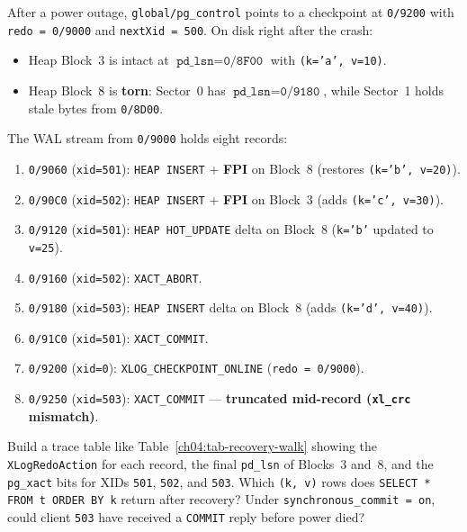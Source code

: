 \begin{exercise}
\label{ch04:ex-trace-recovery}
After a power outage, \texttt{global/pg\_control} points to a checkpoint at \texttt{0/9200} with \texttt{redo = 0/9000} and \texttt{nextXid = 500}. On disk right after the crash:
\begin{itemize}
  \item Heap Block~3 is intact at $\texttt{pd\_lsn} = \texttt{0/8F00}$ with \texttt{(k='a', v=10)}.
  \item Heap Block~8 is \textbf{torn}: Sector~0 has $\texttt{pd\_lsn} = \texttt{0/9180}$, while Sector~1 holds stale bytes from \texttt{0/8D00}.
\end{itemize}
The WAL stream from \texttt{0/9000} holds eight records:
\begin{enumerate}
  \item \texttt{0/9060} (\texttt{xid=501}): \texttt{HEAP INSERT} + \textbf{FPI} on Block~8 (restores \texttt{(k='b', v=20)}).
  \item \texttt{0/90C0} (\texttt{xid=502}): \texttt{HEAP INSERT} + \textbf{FPI} on Block~3 (adds \texttt{(k='c', v=30)}).
  \item \texttt{0/9120} (\texttt{xid=501}): \texttt{HEAP HOT\_UPDATE} delta on Block~8 (\texttt{k='b'} updated to \texttt{v=25}).
  \item \texttt{0/9160} (\texttt{xid=502}): \texttt{XACT\_ABORT}.
  \item \texttt{0/9180} (\texttt{xid=503}): \texttt{HEAP INSERT} delta on Block~8 (adds \texttt{(k='d', v=40)}).
  \item \texttt{0/91C0} (\texttt{xid=501}): \texttt{XACT\_COMMIT}.
  \item \texttt{0/9200} (\texttt{xid=0}): \texttt{XLOG\_CHECKPOINT\_ONLINE} (\texttt{redo = 0/9000}).
  \item \texttt{0/9250} (\texttt{xid=503}): \texttt{XACT\_COMMIT} --- \textbf{truncated mid-record (\texttt{xl\_crc} mismatch)}.
\end{enumerate}
Build a trace table like Table~\ref{ch04:tab-recovery-walk} showing the \texttt{XLogRedoAction} for each record, the final \texttt{pd\_lsn} of Blocks~3 and~8, and the \texttt{pg\_xact} bits for XIDs \texttt{501}, \texttt{502}, and \texttt{503}. Which \texttt{(k, v)} rows does \texttt{SELECT * FROM t ORDER BY k} return after recovery? Under \texttt{synchronous\_commit = on}, could client \texttt{503} have received a \texttt{COMMIT} reply before power died?
\end{exercise}

